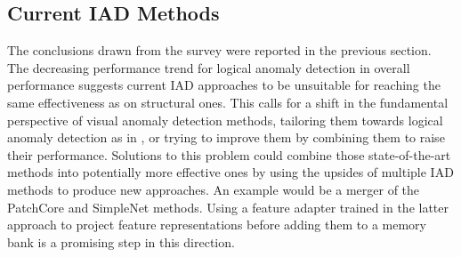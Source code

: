 \subsection{Current IAD Methods}
The conclusions drawn from the survey were reported in the previous section. The decreasing performance trend for logical anomaly detection in overall performance suggests 
current IAD approaches to be unsuitable for reaching the same effectiveness as on structural ones. This calls for a shift in the fundamental perspective of visual anomaly 
detection methods, tailoring them towards logical anomaly detection as in \cite{LOCODentsAndScratchesBergmann2022}, or trying to improve them by combining them to raise their 
performance. Solutions to this problem could combine 
those state-of-the-art methods into potentially more effective ones by using the upsides of multiple IAD methods to produce new approaches. An example would be a 
merger of the PatchCore \cite{patchCore2022} and SimpleNet \cite{liu2023simplenet} methods. Using a feature adapter trained in the latter approach to project feature 
representations before adding them to a memory bank is a promising step in this direction. 

